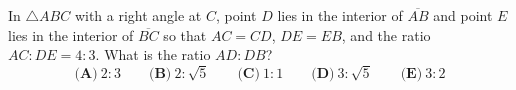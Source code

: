 In $\triangle ABC$ with a right angle at $C$, point $D$ lies in the interior of $\overline{AB}$ and point $E$ lies in the interior of $\overline{BC}$ so that $AC=CD$, $DE=EB$, and the ratio $AC:DE=4:3$. What is the ratio $AD:DB$?
\[
\textbf{(A)}\ 2:3\qquad\textbf{(B)}\ 2:\sqrt5\qquad\textbf{(C)}\ 1:1\qquad\textbf{(D)}\ 3:\sqrt5\qquad\textbf{(E)}\ 3:2
\]

